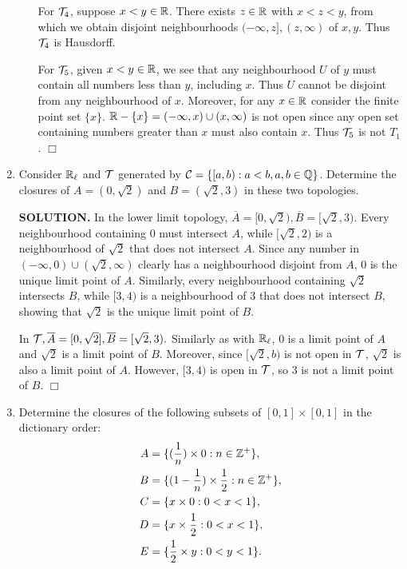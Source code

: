 \documentclass{article}
\begin{document}
\begin{enumerate}
\begin{enumerate}
        For $\mathcal{T}_4$, suppose $x < y \in \mathbb{R}$. There exists $z \in \mathbb{R}$ with $x < z < y$, from which we obtain disjoint neighbourhoods $(-\infty, z], (z, \infty)$ of $x, y$. Thus $\mathcal{T}_4$ is Hausdorff.

        For $\mathcal{T}_5$, given $x < y \in \mathbb{R}$, we see that any neighbourhood $U$ of $y$ must contain all numbers less than $y$, including $x$. Thus $U$ cannot be disjoint from any neighbourhood of $x$. Moreover, for any $x \in \mathbb{R}$ consider the finite point set $\{x\}$. $\mathbb{R} - \{x\} = (-\infty, x) \cup (x, \infty)$ is not open since any open set containing numbers greater than $x$ must also contain $x$. Thus $\mathcal{T}_5$ is not $T_1$. $\Box$
    \end{enumerate}

    \item Consider $\mathbb{R}_\ell$ and $\mathcal{T}$ generated by $\mathcal{C} = \{[a, b) : a<b, a, b \in \mathbb{Q}\}$. Determine the closures of $A = (0, \sqrt2)$ and $B = (\sqrt2, 3)$ in these two topologies.

    {\bf SOLUTION.} In the lower limit topology, $\overline{A} = [0, \sqrt2), \overline{B} = [\sqrt2, 3)$. Every neighbourhood containing $0$ must intersect $A$, while $[\sqrt2, 2)$ is a neighbourhood of $\sqrt2$ that does not intersect $A$. Since any number in $(-\infty, 0) \cup (\sqrt2, \infty)$ clearly has a neighbourhood disjoint from $A$, $0$ is the unique limit point of $A$. Similarly, every neighbourhood containing $\sqrt2$ intersects $B$, while $[3, 4)$ is a neighbourhood of $3$ that does not intersect $B$, showing that $\sqrt2$ is the unique limit point of $B$.

    In $\mathcal{T}, \overline{A} = [0, \sqrt2], \overline{B} = [\sqrt2, 3).$ Similarly as with $\mathbb{R}_\ell$, $0$ is a limit point of $A$ and $\sqrt2$ is a limit point of $B$. Moreover, since $[\sqrt2, b)$ is not open in $\mathcal{T}$, $\sqrt2$ is also a limit point of $A$. However, $[3, 4)$ is open in $\mathcal{T}$, so $3$ is not a limit point of $B$. $\Box$

    \item Determine the closures of the following subsets of $[0, 1] \times [0, 1]$ in the dictionary order:
    \begin{align*}
        A &= \{(\frac1n) \times 0: n \in \mathbb{Z}^+\}, \\
        B &= \{(1 - \frac1n) \times \frac12: n \in \mathbb{Z}^+\}, \\
        C &= \{x \times 0: 0 < x < 1\}, \\
        D &= \{x \times \frac12 : 0 < x < 1\}, \\
        E &= \{\frac12 \times y : 0 < y < 1 \}.
    \end{align*}


\end{enumerate}
\end{document}
